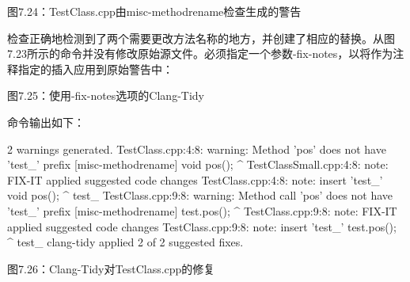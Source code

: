 \begin{center}
图7.24：TestClass.cpp由misc-methodrename检查生成的警告
\end{center}

检查正确地检测到了两个需要更改方法名称的地方，并创建了相应的替换。从图7.23所示的命令并没有修改原始源文件。必须指定一个参数-fix-notes，以将作为注释指定的插入应用到原始警告中：



\begin{center}
图7.25：使用-fix-notes选项的Clang-Tidy
\end{center}

命令输出如下：

\begin{shell}
2 warnings generated.
TestClass.cpp:4:8: warning: Method 'pos' does not have 'test_' prefix
[misc-methodrename]
  void pos(){};
       ^
TestClassSmall.cpp:4:8: note: FIX-IT applied suggested code changes
TestClass.cpp:4:8: note: insert 'test_'
  void pos(){};
       ^
       test_
TestClass.cpp:9:8: warning: Method call 'pos' does not have 'test_' prefix
[misc-methodrename]
  test.pos();
       ^
TestClass.cpp:9:8: note: FIX-IT applied suggested code changes
TestClass.cpp:9:8: note: insert 'test_'
  test.pos();
       ^
       test_
clang-tidy applied 2 of 2 suggested fixes.
\end{shell}


\begin{center}
图7.26：Clang-Tidy对TestClass.cpp的修复
\end{center}

